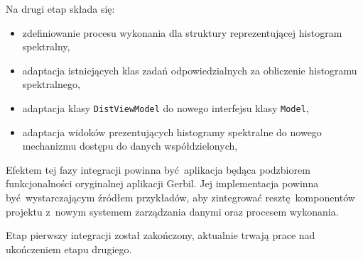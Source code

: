 Na drugi etap składa się:
\begin{itemize}
		\item zdefiniowanie procesu wykonania dla struktury reprezentującej histogram spektralny,
		\item adaptacja istniejących klas zadań odpowiedzialnych za obliczenie histogramu spektralnego,
		\item adaptacja klasy \lstinline$DistViewModel$ do nowego interfejsu klasy \lstinline$Model$,
		\item adaptacja widoków prezentujących histogramy spektralne do nowego mechanizmu dostępu do danych współdzielonych,	
\end{itemize}

Efektem tej fazy integracji powinna być aplikacja będąca podzbiorem funkcjonalności oryginalnej aplikacji Gerbil. Jej implementacja powinna być wystarczającym źródłem przykładów, aby zintegrować resztę komponentów projektu z~nowym systemem zarządzania danymi oraz procesem wykonania.

Etap pierwszy integracji został zakończony, aktualnie trwają prace nad ukończeniem etapu drugiego.


